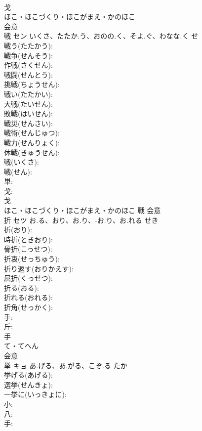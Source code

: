 \documentclass[8pt]{extreport}
\begin{document}
\begin{CJK}{UTF8}{min}
\\	戈	
\\	ほこ・ほこづくり・ほこがまえ・かのほこ	
\\	会意 
\\	戦	セン	いくさ、たたか.う、おのの.く、そよ.ぐ、わなな.く	せ	
\\	戦う(たたかう): 
\\	戦争(せんそう): 
\\	作戦(さくせん): 
\\	戦闘(せんとう): 
\\	挑戦(ちょうせん): 
\\	戦い(たたかい): 
\\	大戦(たいせん): 
\\	敗戦(はいせん): 
\\	戦災(せんさい): 
\\	戦術(せんじゅつ): 
\\	戦力(せんりょく): 
\\	休戦(きゅうせん): 
\\	戦(いくさ): 
\\	戦(せん): 
\\	単: 
\\	戈: 
\\	戈	
\\	ほこ・ほこづくり・ほこがまえ・かのほこ	戰	会意 
\\	折	セツ	お.る、おり、お.り、-お.り、お.れる	せき	
\\	折(おり): 
\\	時折(ときおり): 
\\	骨折(こっせつ): 
\\	折衷(せっちゅう): 
\\	折り返す(おりかえす): 
\\	屈折(くっせつ): 
\\	折る(おる): 
\\	折れる(おれる): 
\\	折角(せっかく): 
\\	手: 
\\	斤: 
\\	手	
\\	て・てへん	
\\	会意 
\\	挙	キョ	あ.げる、あ.がる、こぞ.る	たか	
\\	挙げる(あげる): 
\\	選挙(せんきょ): 
\\	一挙に(いっきょに): 
\\	小: 
\\	八: 
\\	手: 

\end{CJK}
\end{document}
